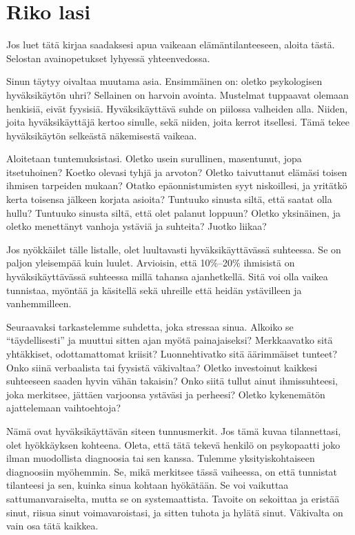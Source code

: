 \section{Riko lasi}

Jos luet tätä kirjaa saadaksesi apua vaikeaan elämäntilanteeseen, aloita tästä. Selostan avainopetukset lyhyessä yhteenvedossa.

Sinun täytyy oivaltaa muutama asia. Ensimmäinen on: oletko psykologisen hyväksikäytön uhri? Sellainen on harvoin avointa. Mustelmat tuppaavat olemaan henkisiä, eivät fyysisiä. Hyväksikäyttävä suhde on piilossa valheiden alla. Niiden, joita hyväksikäyttäjä kertoo sinulle, sekä niiden, joita kerrot itsellesi. Tämä tekee hyväksikäytön selkeästä näkemisestä vaikeaa.

Aloitetaan tuntemuksistasi. Oletko usein surullinen, masentunut, jopa itsetuhoinen? Koetko olevasi tyhjä ja arvoton? Oletko taivuttanut elämäsi toisen ihmisen tarpeiden mukaan? Otatko epäonnistumisten syyt niskoillesi, ja yritätkö kerta toisensa jälkeen korjata asioita? Tuntuuko sinusta siltä, että saatat olla hullu? Tuntuuko sinusta siltä, että olet palanut loppuun? Oletko yksinäinen, ja oletko menettänyt vanhoja ystäviä ja suhteita? Juotko liikaa?

Jos nyökkäilet tälle listalle, olet luultavasti hyväksikäyttävässä suhteessa. Se on paljon yleisempää kuin luulet. Arvioisin, että 10\%--20\% ihmisistä on hyväksikäyttävässä suhteessa millä tahansa ajanhetkellä. Sitä voi olla vaikea tunnistaa, myöntää ja käsitellä sekä uhreille että heidän ystävilleen ja vanhemmilleen.

Seuraavaksi tarkastelemme suhdetta, joka stressaa sinua. Alkoiko se ``täydellisesti'' ja muuttui sitten ajan myötä painajaiseksi? Merkkaavatko sitä yhtäkkiset, odottamattomat kriisit? Luonnehtivatko sitä äärimmäiset tunteet? Onko siinä verbaalista tai fyysistä väkivaltaa? Oletko investoinut kaikkesi suhteeseen saaden hyvin vähän takaisin? Onko siitä tullut ainut ihmissuhteesi, joka merkitsee, jättäen varjoonsa ystäväsi ja perheesi? Oletko kykenemätön ajattelemaan vaihtoehtoja?

Nämä ovat hyväksikäyttävän siteen tunnusmerkit. Jos tämä kuvaa tilannettasi, olet hyökkäyksen kohteena. Oleta, että tätä tekevä henkilö on psykopaatti joko ilman muodollista diagnoosia tai sen kanssa. Tulemme yksityiskohtaiseen diagnoosiin myöhemmin. Se, mikä merkitsee tässä vaiheessa, on että tunnistat tilanteesi ja sen, kuinka sinua kohtaan hyökätään. Se voi vaikuttaa sattumanvaraiselta, mutta se on systemaattista. Tavoite on sekoittaa ja eristää sinut, riisua sinut voimavaroistasi, ja sitten tuhota ja hylätä sinut. Väkivalta on vain osa tätä kaikkea.

